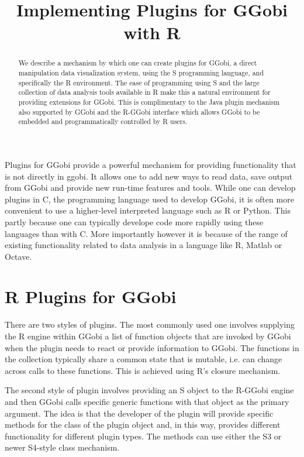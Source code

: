 \documentclass{article}
\title{Implementing Plugins for GGobi with R}
\begin{document}
\maketitle

\begin{abstract}

  We describe a mechanism by which one can create plugins for GGobi, a
  direct manipulation data visualization system, using the S
  programming language, and specifically the R environment.  
  The ease of programming using S and the large collection of 
  data analysis tools available in R make this a natural
  environment for providing extensions for GGobi. This is
  complimentary to the Java plugin mechanism also supported by GGobi
  and the R-GGobi interface which allows GGobi to be embedded and 
  programmatically controlled by R users.

\end{abstract}

 Plugins for GGobi provide a powerful mechanism for providing
 functionality that is not directly in ggobi.
 It allows one to add new ways to read data, save output from GGobi
 and provide new run-time features and tools.
 While one can develop plugins in C, the programming language 
 used to develop GGobi,  it is often more convenient to use
 a higher-level interpreted language such as R or Python.
 This partly because one can typically develope code more
 rapidly using these languages than with C.
 More importantly however it is because of the range of existing
 functionality related to data analysis in a language like R, Matlab
 or Octave.


\section{R Plugins for GGobi}
There are two styles of plugins.  The most commonly used one involves
supplying the R engine within GGobi a list of function objects that
are invoked by GGobi when the plugin needs to react or provide
information to GGobi.  The functions in the collection typically share
a common state that is mutable, i.e. can change across calls to these
functions.  This is achieved using R's closure mechanism.

The second style of plugin involves providing an S object to the
R-GGobi engine and then GGobi calls specific generic functions with
that object as the primary argument.  The idea is that the developer
of the plugin will provide specific methods for the class of the
plugin object and, in this way, provides different functionality for
different plugin types. The methods can use either the S3 or newer
S4-style class mechanism.
\end{document}
